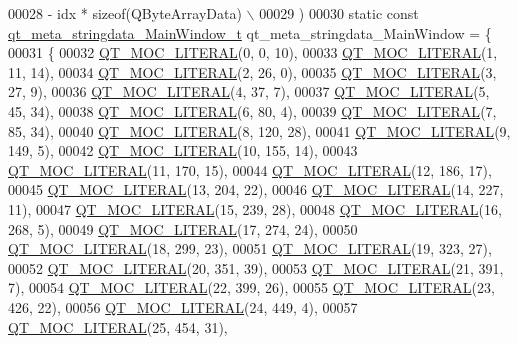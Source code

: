 \begin{DoxyCode}
00028 \textcolor{preprocessor}{        - idx * sizeof(QByteArrayData) \(\backslash\)}
00029 \textcolor{preprocessor}{    )}
00030 \textcolor{keyword}{static} \textcolor{keyword}{const} \hyperlink{a00015_d9/df8/a00096}{qt\_meta\_stringdata\_MainWindow\_t} qt\_meta\_stringdata\_MainWindow =
       \{
00031     \{
00032 \hyperlink{a00015_a75bb9482d242cde0a06c9dbdc6b83abe}{QT\_MOC\_LITERAL}(0, 0, 10),
00033 \hyperlink{a00015_a75bb9482d242cde0a06c9dbdc6b83abe}{QT\_MOC\_LITERAL}(1, 11, 14),
00034 \hyperlink{a00015_a75bb9482d242cde0a06c9dbdc6b83abe}{QT\_MOC\_LITERAL}(2, 26, 0),
00035 \hyperlink{a00015_a75bb9482d242cde0a06c9dbdc6b83abe}{QT\_MOC\_LITERAL}(3, 27, 9),
00036 \hyperlink{a00015_a75bb9482d242cde0a06c9dbdc6b83abe}{QT\_MOC\_LITERAL}(4, 37, 7),
00037 \hyperlink{a00015_a75bb9482d242cde0a06c9dbdc6b83abe}{QT\_MOC\_LITERAL}(5, 45, 34),
00038 \hyperlink{a00015_a75bb9482d242cde0a06c9dbdc6b83abe}{QT\_MOC\_LITERAL}(6, 80, 4),
00039 \hyperlink{a00015_a75bb9482d242cde0a06c9dbdc6b83abe}{QT\_MOC\_LITERAL}(7, 85, 34),
00040 \hyperlink{a00015_a75bb9482d242cde0a06c9dbdc6b83abe}{QT\_MOC\_LITERAL}(8, 120, 28),
00041 \hyperlink{a00015_a75bb9482d242cde0a06c9dbdc6b83abe}{QT\_MOC\_LITERAL}(9, 149, 5),
00042 \hyperlink{a00015_a75bb9482d242cde0a06c9dbdc6b83abe}{QT\_MOC\_LITERAL}(10, 155, 14),
00043 \hyperlink{a00015_a75bb9482d242cde0a06c9dbdc6b83abe}{QT\_MOC\_LITERAL}(11, 170, 15),
00044 \hyperlink{a00015_a75bb9482d242cde0a06c9dbdc6b83abe}{QT\_MOC\_LITERAL}(12, 186, 17),
00045 \hyperlink{a00015_a75bb9482d242cde0a06c9dbdc6b83abe}{QT\_MOC\_LITERAL}(13, 204, 22),
00046 \hyperlink{a00015_a75bb9482d242cde0a06c9dbdc6b83abe}{QT\_MOC\_LITERAL}(14, 227, 11),
00047 \hyperlink{a00015_a75bb9482d242cde0a06c9dbdc6b83abe}{QT\_MOC\_LITERAL}(15, 239, 28),
00048 \hyperlink{a00015_a75bb9482d242cde0a06c9dbdc6b83abe}{QT\_MOC\_LITERAL}(16, 268, 5),
00049 \hyperlink{a00015_a75bb9482d242cde0a06c9dbdc6b83abe}{QT\_MOC\_LITERAL}(17, 274, 24),
00050 \hyperlink{a00015_a75bb9482d242cde0a06c9dbdc6b83abe}{QT\_MOC\_LITERAL}(18, 299, 23),
00051 \hyperlink{a00015_a75bb9482d242cde0a06c9dbdc6b83abe}{QT\_MOC\_LITERAL}(19, 323, 27),
00052 \hyperlink{a00015_a75bb9482d242cde0a06c9dbdc6b83abe}{QT\_MOC\_LITERAL}(20, 351, 39),
00053 \hyperlink{a00015_a75bb9482d242cde0a06c9dbdc6b83abe}{QT\_MOC\_LITERAL}(21, 391, 7),
00054 \hyperlink{a00015_a75bb9482d242cde0a06c9dbdc6b83abe}{QT\_MOC\_LITERAL}(22, 399, 26),
00055 \hyperlink{a00015_a75bb9482d242cde0a06c9dbdc6b83abe}{QT\_MOC\_LITERAL}(23, 426, 22),
00056 \hyperlink{a00015_a75bb9482d242cde0a06c9dbdc6b83abe}{QT\_MOC\_LITERAL}(24, 449, 4),
00057 \hyperlink{a00015_a75bb9482d242cde0a06c9dbdc6b83abe}{QT\_MOC\_LITERAL}(25, 454, 31),

\end{DoxyCode}

